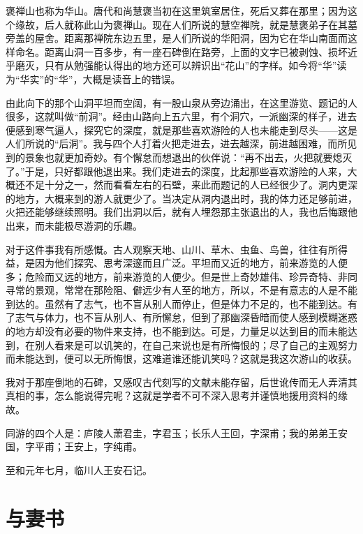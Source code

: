 \documentclass[12pt,UTF-8,openany,a4]{ctexbook}
\begin{document}
\begin{large}\yiwen
    
    褒禅山也称为华山。唐代和尚慧褒当初在这里筑室居住，死后又葬在那里；因为这个缘故，后人就称此山为褒禅山。现在人们所说的慧空禅院，就是慧褒弟子在其墓旁盖的屋舍。距离那禅院东边五里，是人们所说的华阳洞，因为它在华山南面而这样命名。距离山洞一百多步，有一座石碑倒在路旁，上面的文字已被剥蚀、损坏近乎磨灭，只有从勉强能认得出的地方还可以辨识出“花山”的字样。如今将“华”读为“华实”的“华”，大概是读音上的错误。
    
    由此向下的那个山洞平坦而空阔，有一股山泉从旁边涌出，在这里游览、题记的人很多，这就叫做“前洞”。经由山路向上五六里，有个洞穴，一派幽深的样子，进去便感到寒气逼人，探究它的深度，就是那些喜欢游险的人也未能走到尽头——这是人们所说的“后洞”。我与四个人打着火把走进去，进去越深，前进越困难，而所见到的景象也就更加奇妙。有个懈怠而想退出的伙伴说：“再不出去，火把就要熄灭了。”于是，只好都跟他退出来。我们走进去的深度，比起那些喜欢游险的人来，大概还不足十分之一，然而看看左右的石壁，来此而题记的人已经很少了。洞内更深的地方，大概来到的游人就更少了。当决定从洞内退出时，我的体力还足够前进，火把还能够继续照明。我们出洞以后，就有人埋怨那主张退出的人，我也后悔跟他出来，而未能极尽游洞的乐趣。
    
    对于这件事我有所感慨。古人观察天地、山川、草木、虫鱼、鸟兽，往往有所得益，是因为他们探究、思考深邃而且广泛。平坦而又近的地方，前来游览的人便多；危险而又远的地方，前来游览的人便少。但是世上奇妙雄伟、珍异奇特、非同寻常的景观，常常在那险阻、僻远少有人至的地方，所以，不是有意志的人是不能到达的。虽然有了志气，也不盲从别人而停止，但是体力不足的，也不能到达。有了志气与体力，也不盲从别人、有所懈怠，但到了那幽深昏暗而使人感到模糊迷惑的地方却没有必要的物件来支持，也不能到达。可是，力量足以达到目的而未能达到，在别人看来是可以讥笑的，在自己来说也是有所悔恨的；尽了自己的主观努力而未能达到，便可以无所悔恨，这难道谁还能讥笑吗？这就是我这次游山的收获。
    
    我对于那座倒地的石碑，又感叹古代刻写的文献未能存留，后世讹传而无人弄清其真相的事，怎么能说得完呢？这就是学者不可不深入思考并谨慎地援用资料的缘故。
    
    同游的四个人是：庐陵人萧君圭，字君玉；长乐人王回，字深甫；我的弟弟王安国，字平甫；王安上，字纯甫。
    
    至和元年七月，临川人王安石记。
    

\end{large}



\chapter{与妻书}
\end{document}
